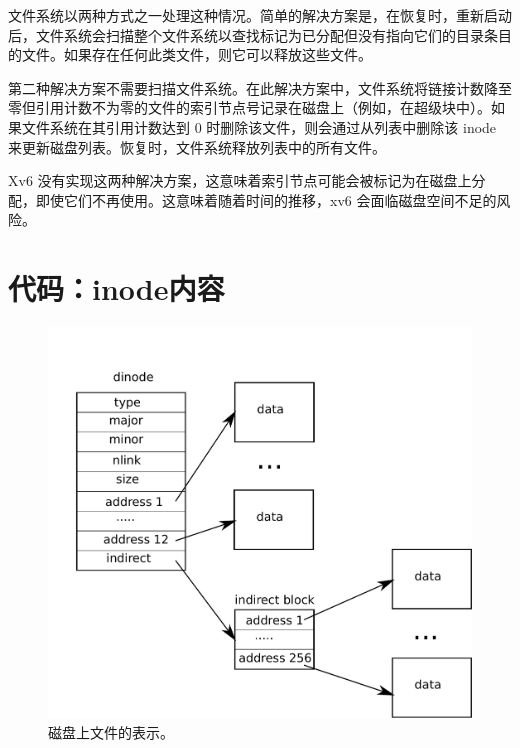 文件系统以两种方式之一处理这种情况。简单的解决方案是，在恢复时，重新启动后，文件系统会扫描整个文件系统以查找标记为已分配但没有指向它们的目录条目的文件。如果存在任何此类文件，则它可以释放这些文件。  

第二种解决方案不需要扫描文件系统。在此解决方案中，文件系统将链接计数降至零但引用计数不为零的文件的索引节点号记录在磁盘上（例如，在超级块中）。如果文件系统在其引用计数达到 0 时删除该文件，则会通过从列表中删除该 inode 来更新磁盘列表。恢复时，文件系统释放列表中的所有文件。  

Xv6 没有实现这两种解决方案，这意味着索引节点可能会被标记为在磁盘上分配，即使它们不再使用。这意味着随着时间的推移，xv6 会面临磁盘空间不足的风险。
    \section{代码：inode内容  }     

   \begin{figure}[t]
\center
\includegraphics[scale=0.5]{fig/inode.pdf}
\caption{磁盘上文件的表示。  }
\label{fig:inode}
\end{figure}     

